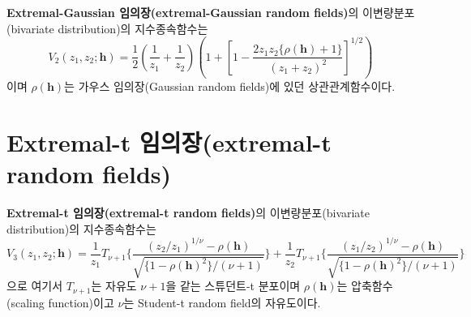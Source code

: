 \documentclass[b5paper,]{scrbook}
\theoremstyle{plain}
\theoremstyle{definition}
\numberwithin{equation}{section}
\begin{document}
\textbf{Extremal-Gaussian 임의장(extremal-Gaussian random fields)}의 이변량분포(bivariate distribution)의 지수종속함수는
\[
V_{2}(z_{1},z_{2};\mathbf{h})=\frac{1}{2}(\frac{1}{z_{1}}+\frac{1}{z_{2}})(1+[1-\frac{2z_{1}z_{2}\{\rho(\mathbf{h})+1\}}{(z_{1}+z_{2})^{2}}]^{1/2})
\]
이며 \(\rho(\mathbf{h})\)는 가우스 임의장(Gaussian random fields)에 있던 상관관계함수이다.

\hypertarget{extremal-t-extremal-t-random-fields}{%
\section{Extremal-t 임의장(extremal-t random fields)}\label{extremal-t-extremal-t-random-fields}}

\textbf{Extremal-t 임의장(extremal-t random fields)}의 이변량분포(bivariate distribution)의 지수종속함수는
\[
V_{3}(z_{1},z_{2};\mathbf{h})=\frac{1}{z_{1}}T_{\nu+1}\{\frac{(z_{2}/z_{1})^{1/\nu}-\rho(\mathbf{h})}{\sqrt{\{ 1-\rho(\mathbf{h})^{2} \}/(\nu+1) }}\} + \frac{1}{z_{2}}T_{\nu+1}\{\frac{(z_{1}/z_{2})^{1/\nu}-\rho(\mathbf{h})}{\sqrt{\{ 1-\rho(\mathbf{h})^{2} \}/(\nu+1) }}\}
\]
으로 여기서 \(T_{\nu+1}\)는 자유도 \(\nu+1\)을 같는 스튜던트-t 분포이며 \(\rho(\mathbf{h})\)는 압축함수(scaling function)이고 \(\nu\)는 Student-t random field의 자유도이다.



\printindex
\end{document}
